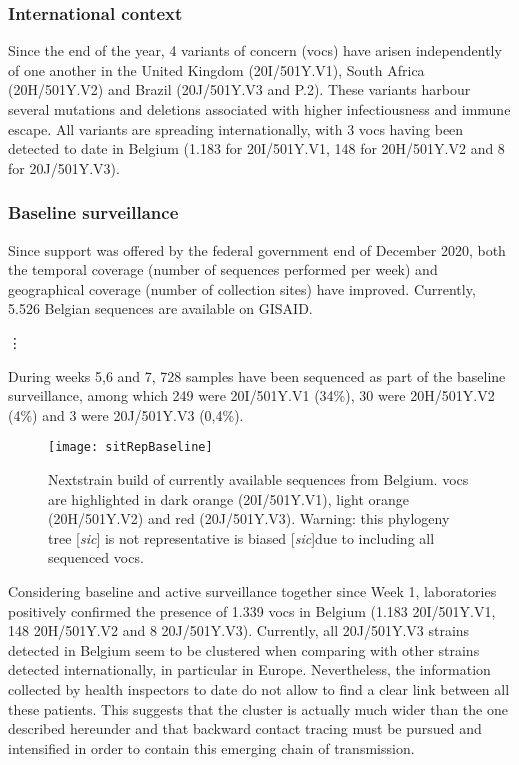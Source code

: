 \subsubsection{International context}
Since the end of the year, 4 variants of concern (\gls{voc}s) have arisen independently of one another in the United Kingdom (20I/501Y.V1), South Africa (20H/501Y.V2) and Brazil (20J/501Y.V3 and P.2).
These variants harbour several mutations and deletions associated with higher infectiousness and immune escape.
All variants are spreading internationally, with 3 \gls{voc}s having been detected to date in Belgium (1.183 for 20I/501Y.V1, 148 for 20H/501Y.V2 and 8 for 20J/501Y.V3).

\subsubsection{Baseline surveillance}
Since support was offered by the federal government end of December 2020, both the temporal coverage (number of sequences performed per week) and geographical coverage (number of collection sites) have improved.
Currently, 5.526 Belgian sequences are available on GISAID.

\vdots

During weeks 5,6 and 7, 728 samples have been sequenced as part of the baseline surveillance, among which 249 were 20I/501Y.V1 (34\%), 30 were 20H/501Y.V2 (4\%) and 3 were 20J/501Y.V3 (0,4\%).

\begin{figure}[ht]
  \centering
  \texttt{[image: sitRepBaseline]}
  \caption[Baseline surveillance VOC phylogeny]{Nextstrain build of currently available sequences from Belgium. \gls{voc}s are highlighted in dark orange (20I/501Y.V1), light orange (20H/501Y.V2) and red (20J/501Y.V3). Warning: this phylogeny tree [\textit{sic}] is not representative is biased [\textit{sic}]due to including all sequenced \gls{voc}s.}
  \label{fig:sitRepBaseline}
\end{figure}

Considering baseline and active surveillance together since Week 1, laboratories positively confirmed the presence of 1.339 \gls{voc}s in Belgium (1.183 20I/501Y.V1, 148 20H/501Y.V2 and 8 20J/501Y.V3).
Currently, all 20J/501Y.V3 strains detected in Belgium seem to be clustered when comparing with other strains detected internationally, in particular in Europe.
Nevertheless, the information collected by health inspectors to date do not allow to find a clear link between all these patients.
This suggests that the cluster is actually much wider than the one described hereunder and that backward contact tracing must be pursued and intensified in order to contain this emerging chain of transmission.

